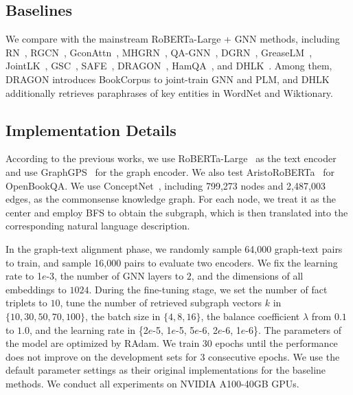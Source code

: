\documentclass[runningheads]{llncs}
\begin{document}
\subsection{Baselines}
We compare with the mainstream RoBERTa-Large + GNN methods, including RN~\cite{ref:rn}, RGCN~\cite{ref:rgcn}, GconAttn~\cite{ref:gconattn}, MHGRN~\cite{ref:mhgrn}, QA-GNN~\cite{ref:qagnn}, DGRN~\cite{ref:dgrn}, GreaseLM~\cite{ref:greaselm}, JointLK~\cite{ref:jointlk}, GSC~\cite{ref:gsc}, SAFE~\cite{ref:safe}, DRAGON~\cite{ref:dragon}, HamQA~\cite{ref:hamqa}, and DHLK~\cite{ref:dhlk}. Among them, DRAGON introduces BookCorpus to joint-train GNN and PLM, and DHLK additionally retrieves paraphrases of key entities in WordNet and Wiktionary.

\subsection{Implementation Details}
According to the previous works, we use RoBERTa-Large~\cite{ref:roberta} as the text encoder and use GraphGPS~\cite{ref:gps} for the graph encoder. We also test AristoRoBERTa~\cite{ref:aristo} for OpenBookQA. We use ConceptNet~\cite{ref:cpnet}, including 799,273 nodes and 2,487,003 edges, as the commonsense knowledge graph. For each node, we treat it as the center and employ BFS to obtain the subgraph, which is then translated into the corresponding natural language description.

In the graph-text alignment phase, we randomly sample 64,000 graph-text pairs to train, and sample 16,000 pairs to evaluate two encoders. We fix the learning rate to 1$e$-3, the number of GNN layers to $2$, and the dimensions of all embeddings to $1024$. During the fine-tuning stage, we set the number of fact triplets to $10$, tune the number of retrieved subgraph vectors $k$ in $\{10, 30, 50, 70, 100\}$, the batch size in $\{4, 8, 16\}$, the balance coefficient $\lambda$ from $0.1$ to $1.0$, and the learning rate in \{2$e$-5, 1$e$-5, 5$e$-6, 2$e$-6, 1$e$-6\}. The parameters of the model are optimized by RAdam. We train 30 epochs until the performance does not
improve on the development sets for 3 consecutive epochs. We use the default parameter settings as their original implementations for the baseline methods. We conduct all experiments on NVIDIA A100-40GB GPUs.
\end{document}
